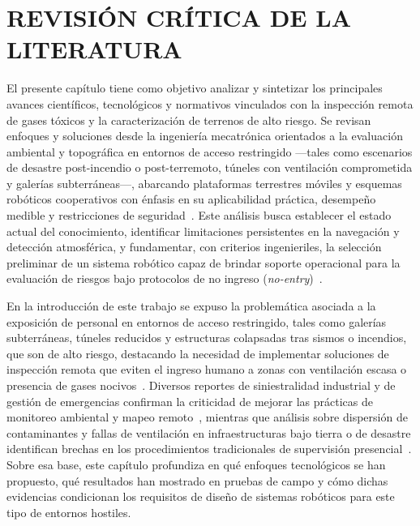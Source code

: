 \chapter{REVISIÓN CRÍTICA DE LA LITERATURA}


\noindent El presente capítulo tiene como objetivo analizar y sintetizar los principales avances científicos, tecnológicos y normativos vinculados con la inspección remota de gases tóxicos y la caracterización de terrenos de alto riesgo. Se revisan enfoques y soluciones desde la ingeniería mecatrónica orientados a la evaluación ambiental y topográfica en entornos de acceso restringido —tales como escenarios de desastre post-incendio o post-terremoto, túneles con ventilación comprometida y galerías subterráneas—, abarcando plataformas terrestres móviles y esquemas robóticos cooperativos con énfasis en su aplicabilidad práctica, desempeño medible y restricciones de seguridad~\cite{CruzUlloa2024_Nose,PutraWidodo2023_Hexapod,ObosuFrimpong2025_MineRescue}. Este análisis busca establecer el estado actual del conocimiento, identificar limitaciones persistentes en la navegación y detección atmosférica, y fundamentar, con criterios ingenieriles, la selección preliminar de un sistema robótico capaz de brindar soporte operacional para la evaluación de riesgos bajo protocolos de no ingreso (\textit{no-entry})~\cite{KimChoi_2025_MineMapping,Machines_2024_ArtificialNose}.

\medskip

\noindent En la introducción de este trabajo se expuso la problemática asociada a la exposición de personal en entornos de acceso restringido, tales como galerías subterráneas, túneles reducidos y estructuras colapsadas tras sismos o incendios, que son de alto riesgo, destacando la necesidad de implementar soluciones de inspección remota que eviten el ingreso humano a zonas con ventilación escasa o presencia de gases nocivos~\cite{CruzUlloa2024_Nose,PutraWidodo2023_Hexapod}. Diversos reportes de siniestralidad industrial y de gestión de emergencias confirman la criticidad de mejorar las prácticas de monitoreo ambiental y mapeo remoto~\cite{ObosuFrimpong2025_MineRescue}, mientras que análisis sobre dispersión de contaminantes y fallas de ventilación en infraestructuras bajo tierra o de desastre identifican brechas en los procedimientos tradicionales de supervisión presencial~\cite{KimChoi_2025_MineMapping,Wang2022_Energies}. Sobre esa base, este capítulo profundiza en qué enfoques tecnológicos se han propuesto, qué resultados han mostrado en pruebas de campo y cómo dichas evidencias condicionan los requisitos de diseño de sistemas robóticos para este tipo de entornos hostiles.

